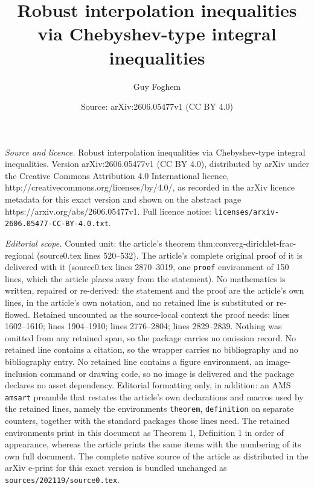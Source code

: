 \documentclass[10pt,a4paper]{amsart}
\title{Robust interpolation inequalities via Chebyshev-type integral inequalities}
\author{Guy Foghem}
\date{Source: arXiv:2606.05477v1 (CC BY 4.0)}
\begin{document}
\maketitle

\noindent\emph{Source and licence.} Robust interpolation inequalities via Chebyshev-type integral inequalities. Version arXiv:2606.05477v1 (CC BY 4.0), distributed by arXiv under the Creative Commons Attribution 4.0 International licence, http://creativecommons.org/licenses/by/4.0/, as recorded in the arXiv licence metadata for this exact version and shown on the abstract page https://arxiv.org/abs/2606.05477v1. Full licence notice: \texttt{licenses/arxiv-2606.05477-CC-BY-4.0.txt}.\par\smallskip

\noindent\textit{Editorial scope.} Counted unit: the article's theorem thm:converg-dirichlet-frac-regional (source0.tex lines 520--532). The article's complete original proof of it is delivered with it (source0.tex lines 2870--3019, one \texttt{proof} environment of 150 lines, which the article places away from the statement). No mathematics is written, repaired or re-derived: the statement and the proof are the article's own lines, in the article's own notation, and no retained line is substituted or re-flowed.  Retained uncounted as the source-local context the proof needs: lines 1602--1610; lines 1904--1910; lines 2776--2804; lines 2829--2839.  Nothing was omitted from any retained span, so the package carries no omission record.  No retained line contains a citation, so the wrapper carries no bibliography and no bibliography entry.  No retained line contains a figure environment, an image-inclusion command or drawing code, so no image is delivered and the package declares no asset dependency.  Editorial formatting only, in addition: an AMS \texttt{amsart} preamble that restates the article's own declarations and macros used by the retained lines, namely the environments \texttt{theorem}, \texttt{definition} on separate counters, together with the standard packages those lines need.  The retained environments print in this document as Theorem 1, Definition 1 in order of appearance, whereas the article prints the same items with the numbering of its own full document.  The complete native source of the article as distributed in the arXiv e-print for this exact version is bundled unchanged as \texttt{sources/202119/source0.tex}.
\end{document}
